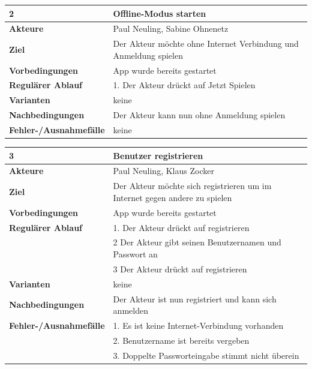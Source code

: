 \documentclass[fontsize=12pt,paper=a4,twoside]{scrartcl}
\begin{document}
\begin{table}
	[H] \label{2} 
	\begin{tabular}
		{|l|p{10cm}|} \hline \textbf{2} & \textbf{Offline-Modus starten} \\
		\hline \textbf{Akteure} & Paul Neuling, Sabine Ohnenetz\\
		\hline \textbf{Ziel} & Der Akteur möchte ohne Internet Verbindung und Anmeldung spielen \\
		\hline \textbf{Vorbedingungen} & App wurde bereits gestartet \\
		\hline \textbf{Regulärer Ablauf} & 1. Der Akteur drückt auf Jetzt Spielen \\
		\hline \textbf{Varianten} & keine \\
		\hline \textbf{Nachbedingungen} & Der Akteur kann nun ohne Anmeldung spielen\\
		\hline \textbf{Fehler-/Ausnahmefälle} & keine \\
		\hline 
	\end{tabular}
\end{table}

\begin{table}
	[H] \label{3} 
	\begin{tabular}
		{|l|p{10cm}|} \hline \textbf{3} & \textbf{Benutzer registrieren} \\
		\hline \textbf{Akteure} & Paul Neuling, Klaus Zocker\\
		\hline \textbf{Ziel} & Der Akteur möchte sich registrieren um im Internet gegen andere zu spielen \\
		\hline \textbf{Vorbedingungen} & App wurde bereits gestartet \\
		\hline \textbf{Regulärer Ablauf} & 1. Der Akteur drückt auf registrieren \\
		&2 Der Akteur gibt seinen Benutzernamen und Passwort an\\
		&3 Der Akteur drückt auf registrieren\\
		\hline \textbf{Varianten} & keine \\
		\hline \textbf{Nachbedingungen} & Der Akteur ist nun registriert und kann sich anmelden\\
		\hline \textbf{Fehler-/Ausnahmefälle} & 1. Es ist keine Internet-Verbindung vorhanden \\
		&2. Benutzername ist bereits vergeben\\
		&3. Doppelte Passworteingabe stimmt nicht überein\\
		\hline 
	\end{tabular}
\end{table}
\end{document}

